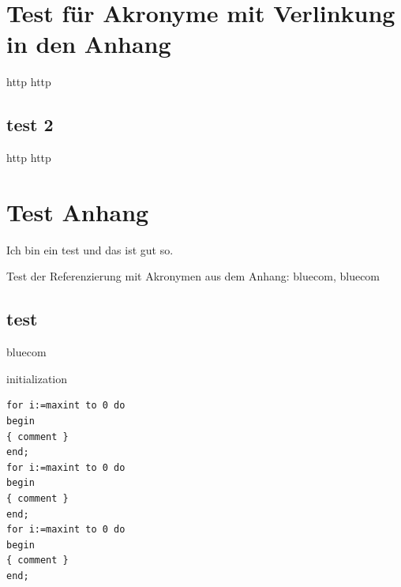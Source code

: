 \documentclass[.\jobname.tex]{subfiles}
\begin{document}
\chapter{Test für Akronyme mit Verlinkung in den Anhang}
\gls{http} \acrshort{http}
%
\section{test 2}
%
\gls{http} \acrshort{http}
%
\chapter{Test Anhang}\label{sec: test anhang}
%
Ich bin ein test und das ist gut so.\par
%
Test der Referenzierung mit Akronymen aus dem Anhang: \gls{bluecom}, \acrshort{bluecom}
%
\section{test}
%
\acrshort{bluecom}
%
\begin{algorithm}
	\SetAlgoNoLine%
	\DontPrintSemicolon%
	initialization\;
	\label{algo: second algo anhang}
\end{algorithm}
%
\begin{lstlisting}[caption={example}]
for i:=maxint to 0 do
begin
{ comment }
end;
for i:=maxint to 0 do
begin
{ comment }
end;
for i:=maxint to 0 do
begin
{ comment }
end;
\end{lstlisting}
%
\blinddocument%
%
\end{document}
